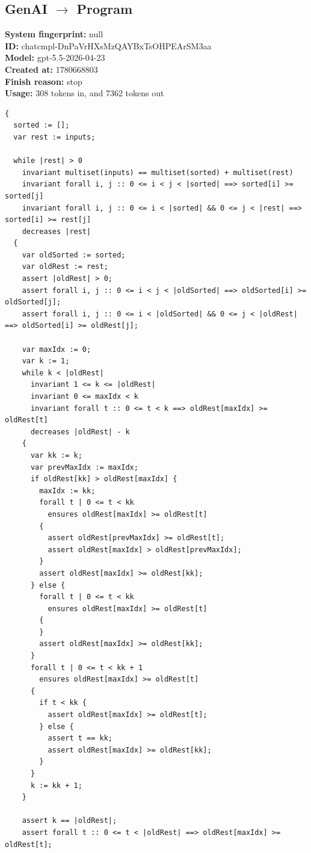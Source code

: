 \documentclass{article}
\begin{document}
\subsection*{GenAI $\rightarrow$ Program}
\textbf{System fingerprint: }null
\\\textbf{ID: }chatcmpl-DnPaVrHXsMzQAYBxTsOHPEArSM3aa
\\\textbf{Model: }gpt-5.5-2026-04-23
\\\textbf{Created at: }1780668803
\\\textbf{Finish reason: }stop
\\\textbf{Usage: }308 tokens in, and 7362 tokens out
\begin{lstlisting}
{
  sorted := [];
  var rest := inputs;

  while |rest| > 0
    invariant multiset(inputs) == multiset(sorted) + multiset(rest)
    invariant forall i, j :: 0 <= i < j < |sorted| ==> sorted[i] >= sorted[j]
    invariant forall i, j :: 0 <= i < |sorted| && 0 <= j < |rest| ==> sorted[i] >= rest[j]
    decreases |rest|
  {
    var oldSorted := sorted;
    var oldRest := rest;
    assert |oldRest| > 0;
    assert forall i, j :: 0 <= i < j < |oldSorted| ==> oldSorted[i] >= oldSorted[j];
    assert forall i, j :: 0 <= i < |oldSorted| && 0 <= j < |oldRest| ==> oldSorted[i] >= oldRest[j];

    var maxIdx := 0;
    var k := 1;
    while k < |oldRest|
      invariant 1 <= k <= |oldRest|
      invariant 0 <= maxIdx < k
      invariant forall t :: 0 <= t < k ==> oldRest[maxIdx] >= oldRest[t]
      decreases |oldRest| - k
    {
      var kk := k;
      var prevMaxIdx := maxIdx;
      if oldRest[kk] > oldRest[maxIdx] {
        maxIdx := kk;
        forall t | 0 <= t < kk
          ensures oldRest[maxIdx] >= oldRest[t]
        {
          assert oldRest[prevMaxIdx] >= oldRest[t];
          assert oldRest[maxIdx] > oldRest[prevMaxIdx];
        }
        assert oldRest[maxIdx] >= oldRest[kk];
      } else {
        forall t | 0 <= t < kk
          ensures oldRest[maxIdx] >= oldRest[t]
        {
        }
        assert oldRest[maxIdx] >= oldRest[kk];
      }
      forall t | 0 <= t < kk + 1
        ensures oldRest[maxIdx] >= oldRest[t]
      {
        if t < kk {
          assert oldRest[maxIdx] >= oldRest[t];
        } else {
          assert t == kk;
          assert oldRest[maxIdx] >= oldRest[kk];
        }
      }
      k := kk + 1;
    }

    assert k == |oldRest|;
    assert forall t :: 0 <= t < |oldRest| ==> oldRest[maxIdx] >= oldRest[t];


\end{lstlisting}
\end{document}
